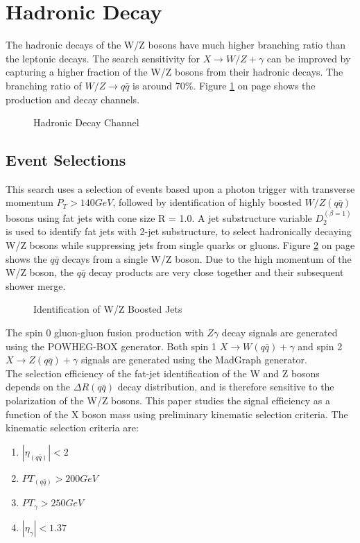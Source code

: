 \documentclass[12pt]{article}
\begin{document}
\section{Hadronic Decay}
The hadronic decays of the W/Z bosons have much higher branching ratio than the leptonic decays. The search sensitivity for $X\rightarrow W/Z + \gamma$ can be improved by capturing a higher fraction of the W/Z bosons from their hadronic decays. The branching ratio of $W/Z\rightarrow q\bar{q}$ is around 70\%. Figure \ref{hadronic} on page \pageref{hadronic} shows the production and decay channels.
\begin{figure}[H]
\begin{center}
\caption[Caption for LOF]{Hadronic Decay Channel}
\label{hadronic}
\end{center}
\end{figure}
\subsection{Event Selections}
This search uses a selection of events based upon a photon trigger with transverse momentum $P_T>140GeV$, followed by identification of highly boosted $W/Z(q\bar{q})$ bosons using fat jets with cone size R = 1.0. A jet substructure variable $D_2^{(\beta=1)}$ is used to identify fat jets with 2-jet substructure, to select hadronically decaying W/Z bosons while suppressing jets from single quarks or gluons. Figure \ref{boosted_jet} on page \pageref{boosted_jet} shows the $q\bar{q}$ decays from a single W/Z boson. Due to the high momentum of the W/Z boson, the $q\bar{q}$ decay products are very close together and their subsequent shower merge.\\
\begin{figure}[H]
\begin{center}
\caption[Caption for LOF]{Identification of W/Z Boosted Jets}
\label{boosted_jet}
\end{center}
\end{figure}
The spin 0 gluon-gluon fusion production with $Z\gamma$ decay signals are generated using the POWHEG-BOX generator. Both spin 1 $X\rightarrow W(q\bar{q}) + \gamma$ and spin 2 $X\rightarrow Z(q\bar{q}) + \gamma$ signals are generated using the MadGraph generator.\\
The selection efficiency of the fat-jet identification of the W and Z bosons depends on the $\Delta R(q\bar{q})$ decay distribution, and is therefore sensitive to the polarization of the W/Z bosons.    This paper studies the signal efficiency as a function of the X boson mass using preliminary kinematic selection criteria. The kinematic selection criteria are:
\begin{enumerate}
\item $|\eta_{(q\bar q)}|<2$
\item $PT_{(q\bar{q})}>200GeV$
\item $PT_\gamma>250GeV$
\item $|\eta_\gamma|<1.37$
\end{enumerate}
\end{document}

